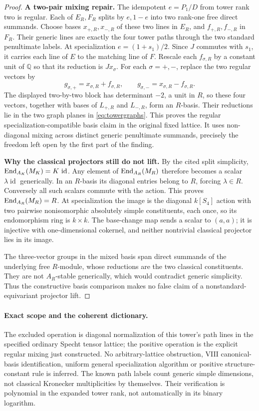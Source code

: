 \documentclass[11pt,a4paper]{article}
\newcommand{\Q}{\mathbb Q}\newcommand{\Z}{\mathbb Z}\newcommand{\C}{\mathbb C}\newcommand{\N}{\mathbb N}\newcommand{\F}{\mathbb F}
\newcommand{\id}{\operatorname{id}}\newcommand{\et}{\mathrm{\acute et}}\newcommand{\boxt}{\boxtimes}
\theoremstyle{named}\newtheorem{finding}{Finding}[section]
\theoremstyle{definition}\newtheorem{definition}[finding]{Definition}
\theoremstyle{remark}\newtheorem{remark}[finding]{Remark}
\begin{document}
\begin{proof}
\par\smallskip\noindent\textbf{A two-pair mixing repair.}\quad
The idempotent $e=P_1/D$ from tower rank two is regular. Each of $E_R,F_R$
splits by $e,1-e$ into two rank-one free direct summands. Choose
bases $x_{+,R},x_{-,R}$ of these two lines in $E_R$, and
$f_{+,R},f_{-,R}$ in $F_R$. Their generic lines are exactly the
four tower paths through the two standard penultimate labels.
At specialization $e=(1+s_1)/2$. Since $J$ commutes with $s_1$,
it carries each line of $E$ to the matching line of $F$. Rescale
each $f_{\sigma,R}$ by a constant unit of $\Q$ so that its
reduction is $Jx_\sigma$.
For each $\sigma=+,-$, replace the two regular vectors by
\[
 g_{\sigma,+}=x_{\sigma,R}+f_{\sigma,R},\qquad
 g_{\sigma,-}=x_{\sigma,R}-f_{\sigma,R}.
\]
The displayed two-by-two block has determinant $-2$, a unit in
$R$, so these four vectors, together with bases of $L_{+,R}$
and $L_{-,R}$, form an $R$-basis. Their reductions lie in the
two graph planes in \eqref{eq:towergraphs}. This proves the
regular specialization-compatible basis claim in the original
fixed lattice. It uses non-diagonal mixing across distinct generic
penultimate summands, precisely the freedom left open by the first
part of the finding.

\par\smallskip\noindent\textbf{Why the classical projectors still do not lift.}\quad
By the cited split simplicity,
$\End_{A_K}(M_K)=K\,\id$. Any element of $\operatorname{End}_{A_R}(M_R)$
therefore becomes a scalar $\lambda\id$ generically. In an
$R$-basis its diagonal entries belong to $R$, forcing $\lambda\in R$.
Conversely all such scalars commute with the action. This proves
$\operatorname{End}_{A_R}(M_R)=R$. At specialization the image is the diagonal
$k[S_4]$ action with two pairwise nonisomorphic absolutely simple
constituents, each once, so its endomorphism ring is $k\times k$.
The base-change map sends a scalar to $(a,a)$; it is injective with
one-dimensional cokernel, and neither nontrivial classical projector
lies in its image.

The three-vector groups in the mixed basis span direct summands of
the underlying free $R$-module, whose reductions are the two
classical constituents. They are not $A_R$-stable generically,
which would contradict generic simplicity. Thus the constructive
basis comparison makes no false claim of a nonstandard-equivariant
projector lift.
\end{proof}

\paragraph{Exact scope and the coherent dictionary.}
The excluded operation is diagonal normalization of this tower's
path lines in the specified ordinary Specht tensor lattice; the
positive operation is the explicit regular mixing just constructed.
No arbitrary-lattice obstruction, VIII canonical-basis identification,
uniform general specialization algorithm or positive structure-constant
rule is inferred. The known path labels count generic simple dimensions,
not classical Kronecker multiplicities by themselves. Their verification
is polynomial in the expanded tower rank, not automatically in its
binary logarithm.
\end{document}
